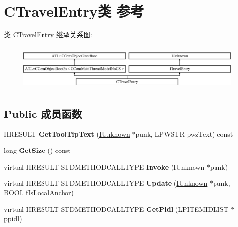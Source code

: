 \hypertarget{class_c_travel_entry}{}\section{C\+Travel\+Entry类 参考}
\label{class_c_travel_entry}
类 C\+Travel\+Entry 继承关系图\+:\begin{figure}[H]
\begin{center}
\leavevmode
\includegraphics[height=2.386364cm]{class_c_travel_entry}
\end{center}
\end{figure}
\subsection*{Public 成员函数}
\begin{DoxyCompactItemize}
\item 
\mbox{\label{class_c_travel_entry_a81bbf8f341c3a3eb3725b58c95f5db18}} 
H\+R\+E\+S\+U\+LT {\bfseries Get\+Tool\+Tip\+Text} (\hyperlink{interface_i_unknown}{I\+Unknown} $\ast$punk, L\+P\+W\+S\+TR pwz\+Text) const
\item 
\mbox{\label{class_c_travel_entry_a60510bb1dacb14be06d0644dde3b0df1}} 
long {\bfseries Get\+Size} () const
\item 
\mbox{\label{class_c_travel_entry_a13b9d8b1bf5796d76b59f2aedc0b8017}} 
virtual H\+R\+E\+S\+U\+LT S\+T\+D\+M\+E\+T\+H\+O\+D\+C\+A\+L\+L\+T\+Y\+PE {\bfseries Invoke} (\hyperlink{interface_i_unknown}{I\+Unknown} $\ast$punk)
\item 
\mbox{\label{class_c_travel_entry_a27b88b1163a6151f84d562efb9aa8b6d}} 
virtual H\+R\+E\+S\+U\+LT S\+T\+D\+M\+E\+T\+H\+O\+D\+C\+A\+L\+L\+T\+Y\+PE {\bfseries Update} (\hyperlink{interface_i_unknown}{I\+Unknown} $\ast$punk, B\+O\+OL f\+Is\+Local\+Anchor)
\item 
\mbox{\label{class_c_travel_entry_aae6c0e1f2a21690489c18048dcab14cc}} 
virtual H\+R\+E\+S\+U\+LT S\+T\+D\+M\+E\+T\+H\+O\+D\+C\+A\+L\+L\+T\+Y\+PE {\bfseries Get\+Pidl} (L\+P\+I\+T\+E\+M\+I\+D\+L\+I\+ST $\ast$ppidl)
\end{DoxyCompactItemize}
